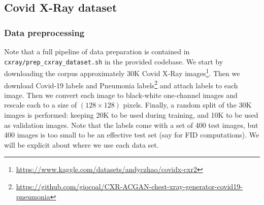 \documentclass{article}
\theoremstyle{plain}
\theoremstyle{definition}
\theoremstyle{remark}
\begin{document}





  \subsection{Covid X-Ray dataset}
	\subsubsection{Data preprocessing}
	
	Note that a full pipeline of data preparation is contained in \texttt{cxray/prep\_cxray\_dataset.sh} in the provided codebase. We start by downloading the corpus approximately 30K Covid X-Ray images\footnote{\href{https://www.kaggle.com/datasets/andyczhao/covidx-cxr2}{https://www.kaggle.com/datasets/andyczhao/covidx-cxr2}}. Then we download Covid-19 labels and Pneumonia labels\footnote{\href{https://github.com/giocoal/CXR-ACGAN-chest-xray-generator-covid19-pneumonia}{https://github.com/giocoal/CXR-ACGAN-chest-xray-generator-covid19-pneumonia}} and attach labels to each image. Then we convert each image to black-white one-channel images and rescale each to a size of $(128\times128)$ pixels. Finally, a random split of the 30K images is performed: keeping 20K to be used during training, and 10K to be used as validation images. Note that the labels come with a set of 400 test images, but 400 images is too small to be an effective test set (say for FID computations). We will be explicit about where we use each data set.
	
\end{document}
